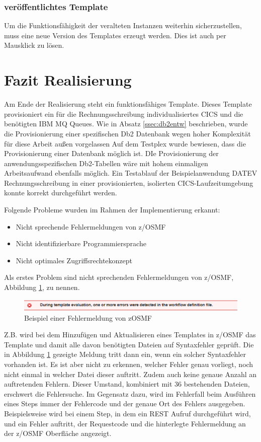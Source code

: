 \subsubsection{veröffentlichtes Template}
Um die Funktionsfähigkeit der veralteten Instanzen weiterhin sicherzustellen, muss eine neue Version des Templates erzeugt werden.
Dies ist auch per Mausklick zu lösen.

\section{Fazit Realisierung}
Am Ende der Realisierung steht ein funktionsfähiges Template.
Dieses Template provisioniert ein für die Rechnungsschreibung individualisiertes CICS und die benötigten IBM MQ Queues. 
Wie in Absatz \ref{ssec:db2entw} beschrieben, wurde die Provisionierung einer spezifischen Db2 Datenbank wegen hoher Komplexität für diese Arbeit außen vorgelassen
Auf dem Testplex wurde bewiesen, dass die Provisionierung einer Datenbank möglich ist.
DIe Provisionierung der anwendungsspezifischen Db2-Tabellen wäre mit hohem einmaligen Arbeitsaufwand ebenfalls möglich.
Ein Testablauf der Beispielanwendung DATEV Rechnungsschreibung in einer provisionierten, isolierten CICS-Laufzeitumgebung konnte korrekt durchgeführt werden.

Folgende Probleme wurden im Rahmen der Implementierung erkannt:

\begin{samepage}
\begin{itemize}
\item Nicht sprechende Fehlermeldungen von z/OSMF
\item Nicht identifizierbare Programmiersprache
\item Nicht optimales Zugriffsrechtekonzept
\end{itemize}
\end{samepage}

Als erstes Problem sind nicht sprechenden Fehlermeldungen von z/OSMF, Abbildung \ref{fig:zosmffehler}, zu nennen.
\begin{figure}[h]
	\centering
	\includegraphics[width=\textwidth]{figures/zosmffehlermeldung.png}
	\caption{Beispiel einer Fehlermeldung von zOSMF}
	\label{fig:zosmffehler}
\end{figure}
Z.B. wird bei dem Hinzufügen und Aktualisieren eines Templates in z/OSMF das Template und damit alle davon benötigten Dateien auf Syntaxfehler geprüft.
Die in Abbildung \ref{fig:zosmffehler} gezeigte Meldung tritt dann ein, wenn ein solcher Syntaxfehler vorhanden ist.
Es ist aber nicht zu erkennen, welcher Fehler genau vorliegt, noch nicht einmal in welcher Datei dieser auftritt.
Zudem auch keine genaue Anzahl an auftretenden Fehlern.
Dieser Umstand, kombiniert mit 36 bestehenden Dateien, erschwert die Fehlersuche.
Im Gegensatz dazu, wird im Fehlerfall beim Ausführen eines Steps immer der Fehlercode und der genaue Ort des Fehlers ausgegeben.
Beispielsweise wird bei einem Step, in dem ein REST Aufruf durchgeführt wird, und ein Fehler auftritt, der Requestcode und die hinterlegte Fehlermeldung an der z/OSMF Oberfläche angezeigt. 

